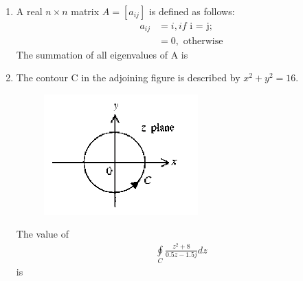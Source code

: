\documentclass[journal,12pt,onecolumn]{IEEEtran}
\theoremstyle{remark}
\begin{document}
\begin{enumerate}
\item A real $n \times n$ matrix $A = [a_{ij}]$ is defined as follows:
\begin{align*}
    a_{ij} &=i, if \text{ i = j}; \\
    &= 0, \text{ otherwise}
\end{align*}
The summation of all eigenvalues of A is

\hfill{}
\begin{enumerate}
\end{enumerate}

\item The contour C in the adjoining figure is described by $x^2 + y^2 = 16$.

\begin{minipage}{0.45\columnwidth}
\begin{figure}[H]
    \centering
    \includegraphics[width = 0.6\columnwidth]{q14}
    \caption*{}
    \label{fig:Q14}
\end{figure}
\end{minipage}
\hspace{0.05\columnwidth}
\begin{minipage}{0.45\columnwidth}
The value of 
\begin{align*}
\oint\limits_{C} \frac{z^2+8}{0.5z - 1.5j} dz
\end{align*}
is 
\end{minipage}

\hfill{}
\begin{enumerate}
\end{enumerate}


\end{enumerate}
\end{document}
